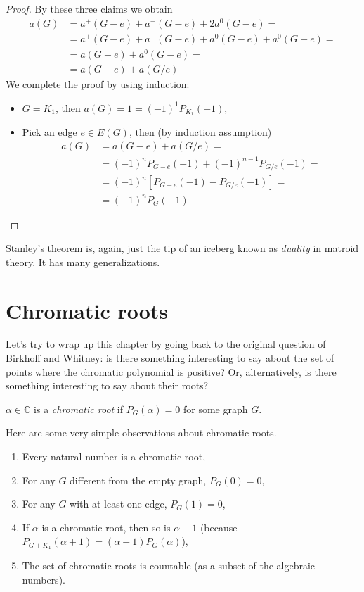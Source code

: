 \begin{proof}
By these three claims we obtain
\begin{align*}
a(G)&=a^+(G-e)+a^-(G-e)+2a^0(G-e)= \\
&= a^+(G-e)+a^-(G-e)+a^0(G-e)+a^0(G-e)= \\
&= a(G-e)+a^0(G-e)= \\
&= a(G-e)+a(G/e)
\end{align*}
We complete the proof by using induction:
\begin{itemize}
\item $G=K_1$, then $a(G)=1=(-1)^1P_{K_1}(-1)$,
\item Pick an edge $e\in E(G)$, then (by induction assumption)
\begin{align*}
a(G)&=a(G-e)+a(G/e)= \\
&= (-1)^nP_{G-e}(-1)+(-1)^{n-1}P_{G/e}(-1)= \\
&= (-1)^n[P_{G-e}(-1)-P_{G/e}(-1)]= \\
&= (-1)^nP_G(-1)
\end{align*}
\end{itemize}
\end{proof}

Stanley's theorem is, again, just the tip of an iceberg known as \emph{duality} in matroid theory. It has many generalizations.


\section{Chromatic roots}

Let's try to wrap up this chapter by going back to the original question of Birkhoff and Whitney: is there something interesting to say about the set of points where the chromatic polynomial is positive? Or, alternatively, is there something interesting to say about their roots?

\begin{definition} $\alpha \in \mathbb{C}$ is a \emph{chromatic root} if $P_G(\alpha)=0$ for some graph $G$.
\end{definition}

Here are some very simple observations about chromatic roots.

\begin{observation}
\begin{enumerate}
\item Every natural number is a chromatic root,
\item For any $G$ different from the empty graph, $P_G(0)=0$,
\item For any $G$ with at least one edge, $P_G(1)=0$,
\item If $\alpha$ is a chromatic root, then so is $\alpha+1$ (because $P_{G+K_1}(\alpha+1)=(\alpha+1)P_G(\alpha)$),
\item The set of chromatic roots is countable (as a subset of the algebraic numbers).
\end{enumerate}
\end{observation}

